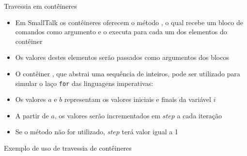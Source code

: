 \begin{frame}[fragile]{Travessia em contêineres}

    \begin{itemize}
        \item Em SmallTalk os contêineres oferecem o método , o qual 
            recebe um bloco de comandos como argumento e o executa para cada um dos elementos
            do contêiner

        \item Os valores destes elementos serão passados como argumentos dos blocos

        \item O contêiner , que abstrai uma sequência de inteiros,
            pode ser utilizado para simular o laço \texttt{for} das linguagens imperativas:


        \item Os valores $a$ e $b$ representam os valores iniciais e finais da variável $i$

        \item A partir de $a$, os valores serão incrementados em $step$ a cada iteração

        \item Se o método  não for utilizado, $step$ terá valor igual a 1
    \end{itemize}

\end{frame}

\begin{frame}[fragile]{Exemplo de uso de travessia de contêineres}
\end{frame}
